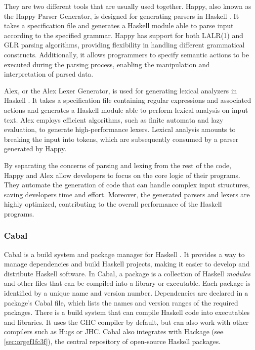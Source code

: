 \documentclass[a4paper, titlepage, twoside]{article}
\begin{document}
They are two different tools that are usually used together. Happy, also known as the Happy Parser Generator, is designed for generating parsers in Haskell \autocite{Happy2023}. It takes a specification file and generates a Haskell module able to parse input according to the specified grammar. Happy has support for both LALR(1) and GLR parsing algorithms, providing flexibility in handling different grammatical constructs. Additionally, it allows programmers to specify semantic actions to be executed during the parsing process, enabling the manipulation and interpretation of parsed data.

Alex, or the Alex Lexer Generator, is used for generating lexical analyzers in Haskell \autocite{AlexLexicalAnalyser2023}. It takes a specification file containing regular expressions and associated actions and generates a Haskell module able to perform lexical analysis on input text. Alex employs efficient algorithms, such as finite automata and lazy evaluation, to generate high-performance lexers. Lexical analysis amounts to breaking the input into tokens, which are subsequently consumed by a parser generated by Happy.

By separating the concerns of parsing and lexing from the rest of the code, Happy and Alex allow developers to focus on the core logic of their programs. They automate the generation of code that can handle complex input structures, saving developers time and effort. Moreover, the generated parsers and lexers are highly optimized, contributing to the overall performance of the Haskell programs.

\subsubsection{Cabal}
\label{sec:org38df580}

Cabal is a build system and package manager for Haskell \autocite{Cabal2023}. It provides a way to manage dependencies and build Haskell projects, making it easier to develop and distribute Haskell software. In Cabal, a package is a collection of Haskell \emph{modules} and other files that can be compiled into a library or executable. Each package is identified by a unique name and version number. Dependencies are declared in a package's Cabal file, which lists the names and version ranges of the required packages. There is a build system that can compile Haskell code into executables and libraries. It uses the GHC compiler by default, but can also work with other compilers such as Hugs or JHC. Cabal also integrates with Hackage (see \ref{sec:orgef1fc3f}), the central repository of open-source Haskell packages.
\end{document}
